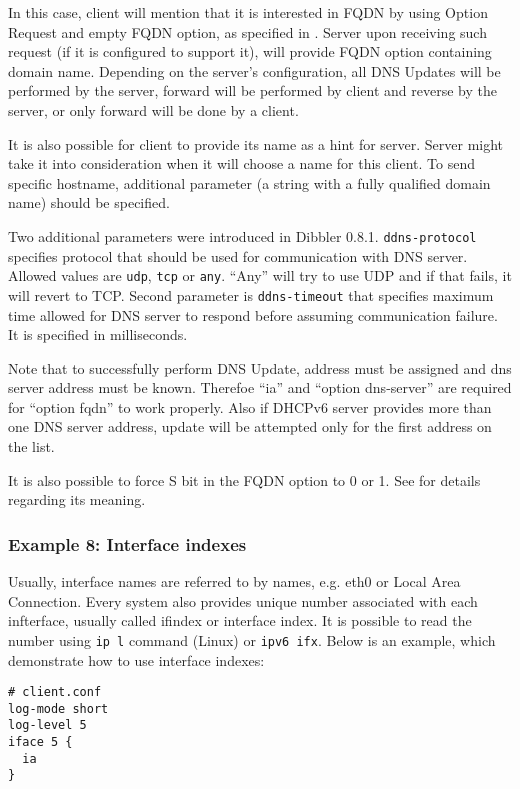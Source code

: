 In this case, client will mention that it is interested in FQDN by
using Option Request and empty FQDN option, as specified in
\cite{rfc4704}. Server upon receiving such request (if it is
configured to support it), will provide FQDN option containing domain
name. Depending on the server's configuration, all DNS Updates will be
performed by the server, forward will be performed by client and reverse
by the server, or only forward will be done by a client.

It is also possible for client to provide its name as a hint for
server. Server might take it into consideration when it will choose a
name for this client. To send specific hostname, additional parameter
(a string with a fully qualified domain name) should be specified.

Two additional parameters were introduced in Dibbler
0.8.1. \verb+ddns-protocol+ specifies protocol that should be used for
communication with DNS server.  Allowed values
are \verb+udp+, \verb+tcp+ or \verb+any+. ``Any'' will try to use UDP
and if that fails, it will revert to TCP. Second parameter
is \verb+ddns-timeout+ that specifies maximum time allowed for DNS
server to respond before assuming communication failure. It is
specified in milliseconds.

Note that to successfully perform DNS Update, address must be assigned
and dns server address must be known. Therefoe  ``ia'' and ``option
dns-server'' are required for ``option fqdn'' to work properly. Also if
DHCPv6 server provides more than one DNS server address, update will
be attempted only for the first address on the list.

It is also possible to force S bit in the FQDN option to 0 or 1. See
\cite{rfc4704} for details regarding its meaning.

\subsubsection{Example 8: Interface indexes}
Usually, interface names are referred to by names, e.g. eth0 or Local
Area Connection. Every system also provides unique number associated
with each infterface, usually called ifindex or interface index. It is
possible to read the number using \verb+ip l+ command (Linux) or
\verb+ipv6 ifx+. Below is an example, which demonstrate how to use
interface indexes:

\begin{lstlisting}
# client.conf
log-mode short
log-level 5
iface 5 {
  ia
}
\end{lstlisting}

